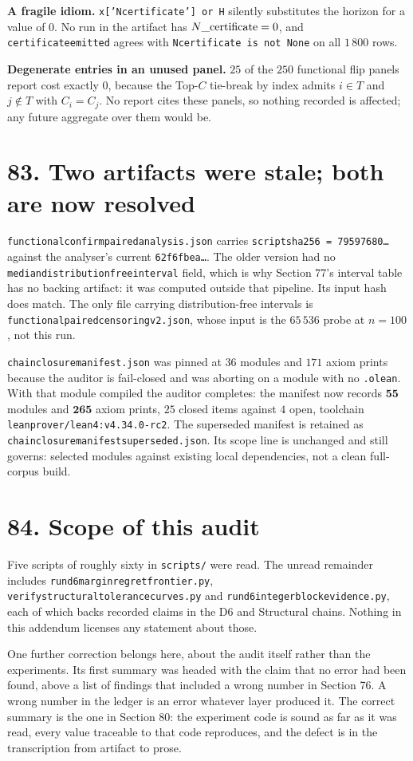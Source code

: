 \documentclass[9pt,twocolumn]{article}
\renewcommand{\_}{\CIGunderscore\allowbreak}
\begin{document}
\textbf{A fragile idiom.} \texttt{x['N\_certificate'] or H} silently substitutes the horizon for a value of $0$. No run in the artifact has $N\_\text{certificate} = 0$, and \texttt{certificate\_emitted} agrees with \texttt{N\_certificate is not None} on all $1\,800$ rows.

\textbf{Degenerate entries in an unused panel.} $25$ of the $250$ functional flip panels report cost exactly $0$, because the Top-$C$ tie-break by index admits $i \in T$ and $j \notin T$ with $C_i = C_j$. No report cites these panels, so nothing recorded is affected; any future aggregate over them would be.

\section*{83. Two artifacts were stale; both are now resolved}

\texttt{functional\_131072\_confirm\_paired\_analysis.json} carries \texttt{script\_sha256 = 79597680\dots} against the analyser's current \texttt{62f6fbea\dots}. The older version had no \texttt{median\_distribution\_free\_interval\_95} field, which is why Section 77's interval table has no backing artifact: it was computed outside that pipeline. Its input hash does match. The only file carrying distribution-free intervals is \texttt{functional\_paired\_censoring\_v2.json}, whose input is the $65\,536$ probe at $n=100$, not this run.

\texttt{chain\_closure\_manifest.json} was pinned at $36$ modules and $171$ axiom prints because the auditor is fail-closed and was aborting on a module with no \texttt{.olean}. With that module compiled the auditor completes: the manifest now records $\mathbf{55}$ modules and $\mathbf{265}$ axiom prints, $25$ closed items against $4$ open, toolchain \texttt{leanprover/lean4:v4.34.0-rc2}. The superseded manifest is retained as \texttt{chain\_closure\_manifest\_20260911\_0241\_superseded.json}. Its scope line is unchanged and still governs: selected modules against existing local dependencies, not a clean full-corpus build.

\section*{84. Scope of this audit}

Five scripts of roughly sixty in \texttt{scripts/} were read. The unread remainder includes \texttt{run\_d6\_margin\_regret\_frontier.py}, \texttt{verify\_structural\_tolerance\_curves.py} and \texttt{run\_d6\_integer\_block\_evidence.py}, each of which backs recorded claims in the D6 and Structural chains. Nothing in this addendum licenses any statement about those.

One further correction belongs here, about the audit itself rather than the experiments. Its first summary was headed with the claim that no error had been found, above a list of findings that included a wrong number in Section 76. A wrong number in the ledger is an error whatever layer produced it. The correct summary is the one in Section 80: the experiment code is sound as far as it was read, every value traceable to that code reproduces, and the defect is in the transcription from artifact to prose.
\end{document}
